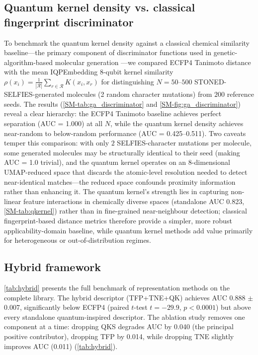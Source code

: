 \documentclass[11pt,a4paper]{article}
\begin{document}
\subsection{Quantum kernel density vs. classical fingerprint discriminator}

To benchmark the quantum kernel density against a classical chemical similarity baseline---the primary component of discriminator functions used in genetic-algorithm-based molecular generation \citep{jensen2019augmenting}---we compared ECFP4 Tanimoto distance with the mean IQPEmbedding 8-qubit kernel similarity $\rho(x_i) = \frac{1}{|\mathcal{R}|}\sum_{r \in \mathcal{R}} K(x_i, x_r)$ for distinguishing $N = 50$--$500$ STONED-SELFIES-generated molecules (2 random character mutations) from $200$ reference seeds. The results (\cref{SM-tab:ga_discriminator} and \cref{SM-fig:ga_discriminator}) reveal a clear hierarchy: the ECFP4 Tanimoto baseline achieves perfect separation (AUC = \num{1.000}) at all $N$, while the quantum kernel density achieves near-random to below-random performance (AUC = \numrange{0.425}{0.511}). Two caveats temper this comparison: with only $2$ SELFIES-character mutations per molecule, some generated molecules may be structurally identical to their seed (making AUC = \num{1.0} trivial), and the quantum kernel operates on an 8-dimensional UMAP-reduced space that discards the atomic-level resolution needed to detect near-identical matches---the reduced space confounds proximity information rather than enhancing it. The quantum kernel's strength lies in capturing non-linear feature interactions in chemically diverse spaces (standalone AUC \num{0.823}, \cref{SM-tab:qkernel}) rather than in fine-grained near-neighbour detection; classical fingerprint-based distance metrics therefore provide a simpler, more robust applicability-domain baseline, while quantum kernel methods add value primarily for heterogeneous or out-of-distribution regimes.

\subsection{Hybrid framework}

\cref{tab:hybrid} presents the full benchmark of representation methods on the complete library. The hybrid descriptor (TFP+TNE+QK) achieves AUC \num{0.888} $\pm$ \num{0.007}, significantly below ECFP4 (paired $t$-test $t = -29.9$, $p < 0.0001$) but above every standalone quantum-inspired descriptor. The ablation study removes one component at a time: dropping QKS degrades AUC by \num{0.040} (the principal positive contributor), dropping TFP by \num{0.014}, while dropping TNE slightly improves AUC (\num{+0.011}) (\cref{tab:hybrid}).
\end{document}
